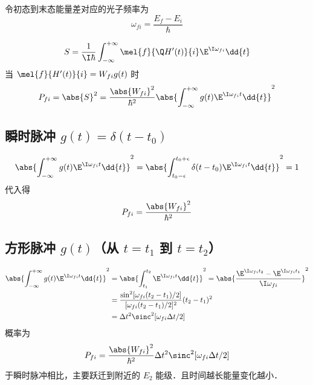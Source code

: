 

令初态到末态能量差对应的光子频率为
\begin{equation}
\omega_{fi} = \frac{E_f - E_i}{\hbar}
\end{equation}

\begin{equation}
S = \frac{1}{\I\hbar} \int_{-\infty}^{+\infty} \mel{f}{\Q H'(t)}{i} \E^{\I\omega_{fi}} \dd{t}
\end{equation}
当 $\mel{f}{H'(t)}{i} = W_{fi} g(t)$ 时
\begin{equation}
P_{fi} = \abs{S}^2 = \frac{\abs{W_{fi}}^2}{\hbar^2} \abs{\int_{-\infty}^{+\infty} g(t) \E^{\I\omega_{fi} t} \dd{t}}^2
\end{equation}

\subsection{瞬时脉冲 $g(t) = \delta(t-t_0)$}
\begin{equation}
\abs{\int_{-\infty}^{+\infty} g(t) \E^{\I\omega_{fi} t} \dd{t}}^2
= \abs{\int_{t_0-\epsilon}^{t_0+\epsilon} \delta(t-t_0) \E^{\I\omega_{fi} t} \dd{t}}^2
= 1
\end{equation}
代入得
\begin{equation}
P_{fi} = \frac{\abs{W_{fi}}^2}{\hbar^2}
\end{equation}

\subsection{方形脉冲 $g(t)$（从 $t=t_1$ 到 $t=t_2$）}
\begin{equation}\begin{aligned}
\abs{\int_{-\infty}^{+\infty} g(t) \E^{\I\omega_{fi}t} \dd{t}}^2
&= \abs{\int_{t_1}^{t_2} \E^{\I\omega_{fi}t} \dd{t}}^2
= \abs{\frac{\E^{\I\omega_{fi}t_2} - \E^{\I\omega_{fi}t_1}}{\I\omega_{fi}}}^2\\
&= \frac{\sin^2[\omega_{fi}(t_2-t_1)/2]}{[\omega_{fi}(t_2-t_1)/2]^2} (t_2-t_1)^2 \\
&= \Delta t^2 \sinc^2[\omega_{fi}\Delta t/2]
\end{aligned}\end{equation}
概率为
\begin{equation}
P_{fi} = \frac{\abs{W_{fi}}^2}{\hbar^2} \Delta t^2 \sinc^2[\omega_{fi}\Delta t/2]
\end{equation}
于瞬时脉冲相比，主要跃迁到附近的 $E_2$ 能级．且时间越长能量变化越小．

